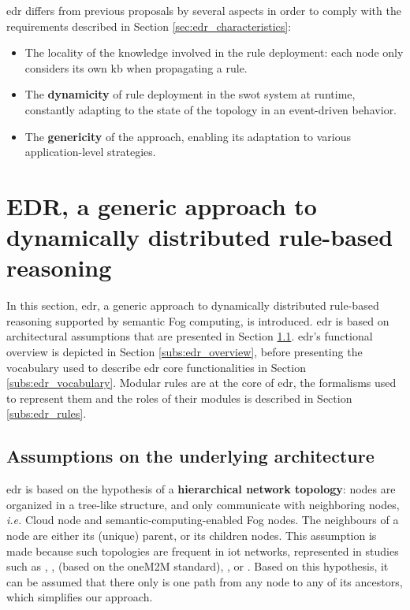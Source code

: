\documentclass[sw]{iosart2x}
\begin{document}
\gls{edr} differs from previous proposals by several aspects in order to comply with the requirements described in Section \textsection \ref{sec:edr_characteristics}:
\begin{itemize}
	\item The locality of the knowledge involved in the rule deployment: each node only considers its own \gls{kb} when propagating a rule.
	\item The \textbf{dynamicity} of rule deployment in the \gls{swot} system at runtime, constantly adapting to the state of the topology in an event-driven behavior.
	\item The \textbf{genericity} of the approach, enabling its adaptation to various application-level strategies.
\end{itemize} 

\section[Distributing reasoning with EDR]{EDR, a generic approach to dynamically distributed rule-based reasoning}
\label{sec:edr}

In this section, \gls{edr}, a generic approach to dynamically distributed rule-based reasoning supported by semantic Fog computing, is introduced. 
\gls{edr} is based on architectural assumptions that are presented in Section \textsection \ref{subs:edr_asumptions}.
\gls{edr}'s functional overview is depicted in Section \textsection \ref{subs:edr_overview}, before presenting the vocabulary used to describe \gls{edr} core functionalities in Section \textsection \ref{subs:edr_vocabulary}.
Modular rules are at the core of \gls{edr}, the formalisms used to represent them and the roles of their modules is described in Section \textsection \ref{subs:edr_rules}.

\subsection{Assumptions on the underlying architecture}
\label{subs:edr_asumptions}

\gls{edr} is based on the hypothesis of a \textbf{hierarchical network topology}: nodes are organized in a tree-like structure, and only communicate with neighboring nodes, \textit{i.e.} Cloud node and semantic-computing-enabled Fog nodes. 
The neighbours of a node are either its (unique) parent, or its children nodes. 
This assumption is made because such topologies are frequent in \gls{iot} networks, represented in studies such as \cite{Rodriguez2010}, \cite{Zanella2014}, \cite{Alaya2015} (based on the oneM2M standard), \cite{Szilagyi2016}, or \cite{Su2018}.
Based on this hypothesis, it can be assumed that there only is one path from any node to any of its ancestors, which simplifies our approach.
\end{document}
